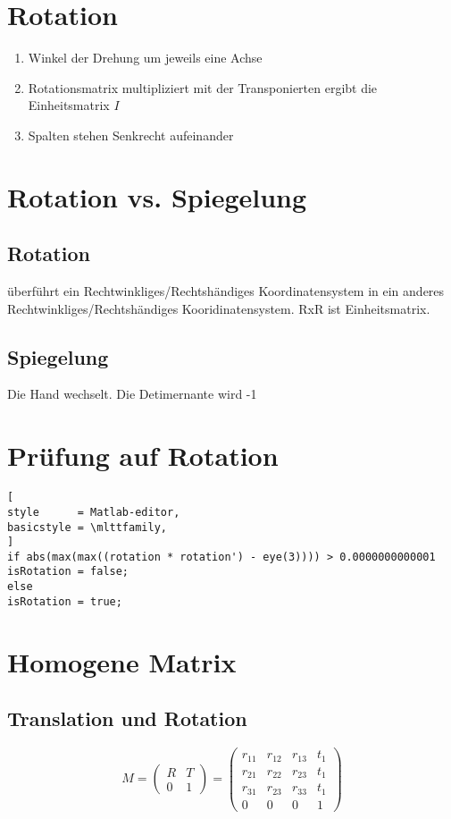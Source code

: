 \section{Rotation}

\begin{enumerate}
	\item Winkel der Drehung um jeweils eine Achse
	\item Rotationsmatrix multipliziert mit der Transponierten ergibt die Einheitsmatrix $I$
	\item Spalten stehen Senkrecht aufeinander
\end{enumerate}

\section{Rotation vs. Spiegelung}

	\subsection{Rotation}
 		überführt ein Rechtwinkliges/Rechtshändiges Koordinatensystem in ein anderes Rechtwinkliges/Rechtshändiges Kooridinatensystem. RxR ist Einheitsmatrix.
 	\subsection{Spiegelung}
		Die Hand wechselt. Die Detimernante wird -1

\section{Prüfung auf Rotation}

\begin{lstlisting}[
style      = Matlab-editor,
basicstyle = \mlttfamily,
]
if abs(max(max((rotation * rotation') - eye(3)))) > 0.0000000000001
isRotation = false;
else
isRotation = true;

\end{lstlisting}


\section{Homogene Matrix}

\subsection{Translation und Rotation}
\begin{equation}
	M = 
	\left(
	\begin{array}{cc}
		R & T\\
		0 & 1
	\end{array}
	\right)
	=
	\left(
	\begin{array}{cccc}
		r_{11} & r_{12} & r_{13} & t_{1} \\
		r_{21} & r_{22} & r_{23} & t_{1} \\
		r_{31} & r_{23} & r_{33} & t_{1} \\
		0 	   & 0    & 0    & 1  
	\end{array}
	\right)	
\end{equation}

